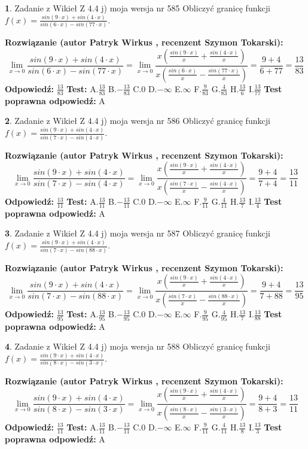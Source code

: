 \documentclass[12pt, a4paper]{article}
\theoremstyle{definition} %
\newtheorem{zad}{}
\newcommand{\zadStart}[1]{\begin{zad}#1\newline}
\newcommand{\zadStop}{\end{zad}}
\newcommand{\rozwStart}[2]{\noindent \textbf{Rozwiązanie (autor #1 , recenzent #2): }\newline}
\newcommand{\rozwStop}{\newline}
\newcommand{\odpStart}{\noindent \textbf{Odpowiedź:}\newline}
\newcommand{\odpStop}{\newline}
\newcommand{\testStart}{\noindent \textbf{Test:}\newline}
\newcommand{\testStop}{\newline}
\newcommand{\kluczStart}{\noindent \textbf{Test poprawna odpowiedź:}\newline}
\newcommand{\kluczStop}{\newline}
\begin{document}
\zadStart{Zadanie z Wikieł Z 4.4 j) moja wersja nr 585}
Obliczyć granicę funkcji $f(x)=\frac{sin(9\cdot x) +sin(4\cdot x)}{sin(6\cdot x) -sin(77\cdot x)}$.
\zadStop
\rozwStart{Patryk Wirkus}{Szymon Tokarski}
$$\lim\limits_{x\to 0}\frac{sin(9\cdot x) +sin(4\cdot x)}{sin(6\cdot x) -sin(77\cdot x)}=\lim\limits_{x\to 0}\frac{x(\frac{sin(9\cdot x)}{x}+\frac{sin(4\cdot x)}{x})}{x(\frac{sin(6\cdot x)}{x}-\frac{sin(77\cdot x)}{x})}=\frac{9+4}{6+77} = \frac{13}{83}$$
\rozwStop
\odpStart
$\frac{13}{83}$
\odpStop
\testStart
A.$\frac{13}{83}$
B.$-\frac{13}{83}$
C.$0$
D.$-\infty$
E.$\infty$
F.$\frac{9}{83}$
G.$\frac{4}{83}$
H.$\frac{13}{6}$
I.$\frac{13}{77}$
\testStop
\kluczStart
A
\kluczStop



\zadStart{Zadanie z Wikieł Z 4.4 j) moja wersja nr 586}
Obliczyć granicę funkcji $f(x)=\frac{sin(9\cdot x) +sin(4\cdot x)}{sin(7\cdot x) -sin(4\cdot x)}$.
\zadStop
\rozwStart{Patryk Wirkus}{Szymon Tokarski}
$$\lim\limits_{x\to 0}\frac{sin(9\cdot x) +sin(4\cdot x)}{sin(7\cdot x) -sin(4\cdot x)}=\lim\limits_{x\to 0}\frac{x(\frac{sin(9\cdot x)}{x}+\frac{sin(4\cdot x)}{x})}{x(\frac{sin(7\cdot x)}{x}-\frac{sin(4\cdot x)}{x})}=\frac{9+4}{7+4} = \frac{13}{11}$$
\rozwStop
\odpStart
$\frac{13}{11}$
\odpStop
\testStart
A.$\frac{13}{11}$
B.$-\frac{13}{11}$
C.$0$
D.$-\infty$
E.$\infty$
F.$\frac{9}{11}$
G.$\frac{4}{11}$
H.$\frac{13}{7}$
I.$\frac{13}{4}$
\testStop
\kluczStart
A
\kluczStop



\zadStart{Zadanie z Wikieł Z 4.4 j) moja wersja nr 587}
Obliczyć granicę funkcji $f(x)=\frac{sin(9\cdot x) +sin(4\cdot x)}{sin(7\cdot x) -sin(88\cdot x)}$.
\zadStop
\rozwStart{Patryk Wirkus}{Szymon Tokarski}
$$\lim\limits_{x\to 0}\frac{sin(9\cdot x) +sin(4\cdot x)}{sin(7\cdot x) -sin(88\cdot x)}=\lim\limits_{x\to 0}\frac{x(\frac{sin(9\cdot x)}{x}+\frac{sin(4\cdot x)}{x})}{x(\frac{sin(7\cdot x)}{x}-\frac{sin(88\cdot x)}{x})}=\frac{9+4}{7+88} = \frac{13}{95}$$
\rozwStop
\odpStart
$\frac{13}{95}$
\odpStop
\testStart
A.$\frac{13}{95}$
B.$-\frac{13}{95}$
C.$0$
D.$-\infty$
E.$\infty$
F.$\frac{9}{95}$
G.$\frac{4}{95}$
H.$\frac{13}{7}$
I.$\frac{13}{88}$
\testStop
\kluczStart
A
\kluczStop



\zadStart{Zadanie z Wikieł Z 4.4 j) moja wersja nr 588}
Obliczyć granicę funkcji $f(x)=\frac{sin(9\cdot x) +sin(4\cdot x)}{sin(8\cdot x) -sin(3\cdot x)}$.
\zadStop
\rozwStart{Patryk Wirkus}{Szymon Tokarski}
$$\lim\limits_{x\to 0}\frac{sin(9\cdot x) +sin(4\cdot x)}{sin(8\cdot x) -sin(3\cdot x)}=\lim\limits_{x\to 0}\frac{x(\frac{sin(9\cdot x)}{x}+\frac{sin(4\cdot x)}{x})}{x(\frac{sin(8\cdot x)}{x}-\frac{sin(3\cdot x)}{x})}=\frac{9+4}{8+3} = \frac{13}{11}$$
\rozwStop
\odpStart
$\frac{13}{11}$
\odpStop
\testStart
A.$\frac{13}{11}$
B.$-\frac{13}{11}$
C.$0$
D.$-\infty$
E.$\infty$
F.$\frac{9}{11}$
G.$\frac{4}{11}$
H.$\frac{13}{8}$
I.$\frac{13}{3}$
\testStop
\kluczStart
A
\kluczStop
\end{document}
